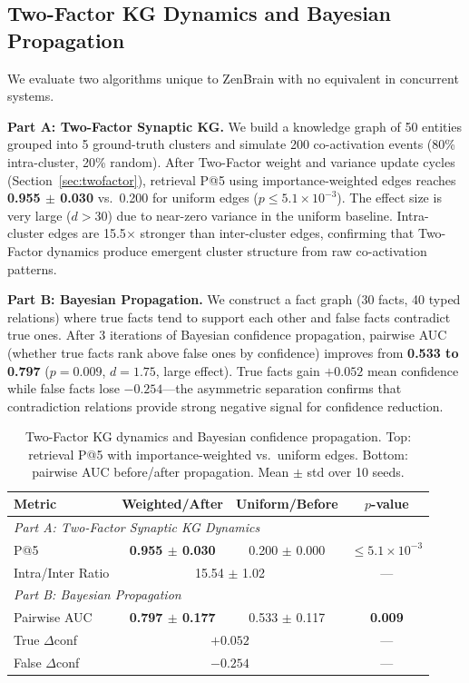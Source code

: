 \documentclass{article}
\begin{document}
\subsection{Two-Factor KG Dynamics and Bayesian Propagation}
\label{app:twofactor-bayesian}

We evaluate two algorithms unique to ZenBrain with no equivalent in
concurrent systems.

\textbf{Part A: Two-Factor Synaptic KG.}
We build a knowledge graph of 50 entities grouped into 5 ground-truth clusters
and simulate 200 co-activation events (80\% intra-cluster, 20\% random).
After Two-Factor weight and variance update cycles (Section~\ref{sec:twofactor}),
retrieval P@5 using importance-weighted edges reaches
\textbf{0.955 $\pm$ 0.030} vs.\ 0.200 for uniform edges
($p \le 5.1\times 10^{-3}$).
The effect size is very large ($d > 30$) due to near-zero variance
in the uniform baseline.
Intra-cluster edges are 15.5$\times$ stronger than inter-cluster edges,
confirming that Two-Factor dynamics produce emergent cluster structure
from raw co-activation patterns.

\textbf{Part B: Bayesian Propagation.}
We construct a fact graph (30 facts, 40 typed relations) where
true facts tend to support each other and false facts contradict true ones.
After 3 iterations of Bayesian confidence propagation,
pairwise AUC (whether true facts rank above false ones by confidence)
improves from \textbf{0.533 to 0.797} ($p = 0.009$, $d = 1.75$, large effect).
True facts gain $+0.052$ mean confidence while false facts lose
$-0.254$---the asymmetric separation confirms that contradiction
relations provide strong negative signal for confidence reduction.

\begin{table}[h]
    \caption{Two-Factor KG dynamics and Bayesian confidence propagation.
    Top: retrieval P@5 with importance-weighted vs.\ uniform edges.
    Bottom: pairwise AUC before/after propagation.
    Mean $\pm$ std over 10 seeds.}
    \label{tab:hebbian-bayesian}
    \centering
    \begin{tabular}{lccc}
        \toprule
        Metric & Weighted/After & Uniform/Before & $p$-value \\
        \midrule
        \multicolumn{4}{l}{\textit{Part A: Two-Factor Synaptic KG Dynamics}} \\
        P@5 & \textbf{0.955 $\pm$ 0.030} & 0.200 $\pm$ 0.000 & $\le 5.1\times 10^{-3}$ \\
        Intra/Inter Ratio & \multicolumn{2}{c}{15.54 $\pm$ 1.02} & --- \\
        \midrule
        \multicolumn{4}{l}{\textit{Part B: Bayesian Propagation}} \\
        Pairwise AUC & \textbf{0.797 $\pm$ 0.177} & 0.533 $\pm$ 0.117 & \textbf{0.009} \\
        True $\Delta$conf & \multicolumn{2}{c}{$+0.052$} & --- \\
        False $\Delta$conf & \multicolumn{2}{c}{$-0.254$} & --- \\
        \bottomrule
    \end{tabular}
\end{table}
\end{document}
